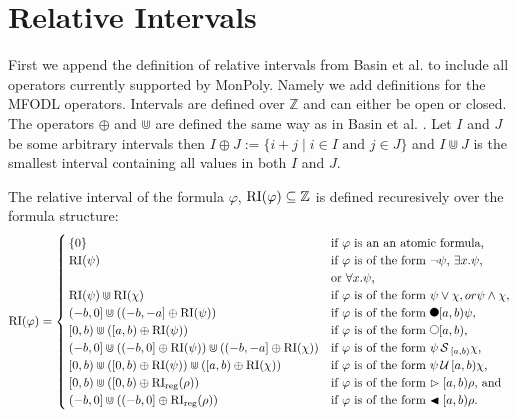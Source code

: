\section{Relative Intervals}

First we append the definition of relative intervals from Basin et al. \cite{Basin2016} to include all operators currently supported by MonPoly.
Namely we add definitions for the MFODL operators.
Intervals are defined over $\mathbb{Z}$ and can either be open or closed.
The operators $\oplus$ and $\Cup$ are defined the same way as in Basin et al. \cite{Basin2016}.
Let $I$ and $J$ be some arbitrary intervals then $I \oplus J := \{i+j \mid i \in I \text{ and } j \in J\}$ and $I \Cup J$ is the smallest interval containing all values in both $I$ and $J$.

\begin{definition} 
    The relative interval of the formula $\varphi$, $\operatorname{RI}(\varphi) \subseteq \mathbb{Z}$ is defined recuresively over the formula structure: 
    \begin{equation*}
        \RI(\varphi) =
        \begin{cases}
            \{0\}     & \text{if $\varphi$ is an an atomic formula,} \\ 
            \RI(\psi) & \text{if $\varphi$ is of the form $\neg \psi$, 
                                $\exists x.\psi$,} \\ &\text{or $\forall x.\psi$,} \\
            \RI(\psi) \Cup \RI(\chi) & \text{if $\varphi$ is of the form $\psi \lor \chi, or
                                            \psi \land \chi$,} \\
            (-b,0] \Cup ((-b,-a] \oplus \RI(\psi)) & \text{if $\varphi$ is of the form $\Previous{[a,b)}\psi$,} \\
            [0,b) \Cup ([a,b) \oplus \RI(\psi)) & \text{if $\varphi$ is of the form $\Next{[a,b)}$,}\\
            (-b,0] \Cup ((-b,0] \oplus \RI(\psi)) \Cup ((-b,-a] \oplus \RI(\chi)) & \text{if $\varphi$ is of the form $\psi \Since{}_{[a,b)} \chi$,} \\
            [0,b) \Cup ([0,b) \oplus \RI(\psi)) \Cup ([a,b) \oplus \RI(\chi)) & \text{if $\varphi$ is of the form $\psi \Until{[a,b)} \chi$,} \\
            [0,b) \Cup ([0,b) \oplus \RIr(\rho)) & \text{if $\varphi$ is of the form $\Fregex{[a,b)} \rho$, and}\\
            (-b,0] \Cup ((-b,0] \oplus \RIr(\rho)) & \text{if $\varphi$ is of the form $\Pregex{[a,b)} \rho$.}\\
        \end{cases}
    \end{equation*}
\end{definition}

